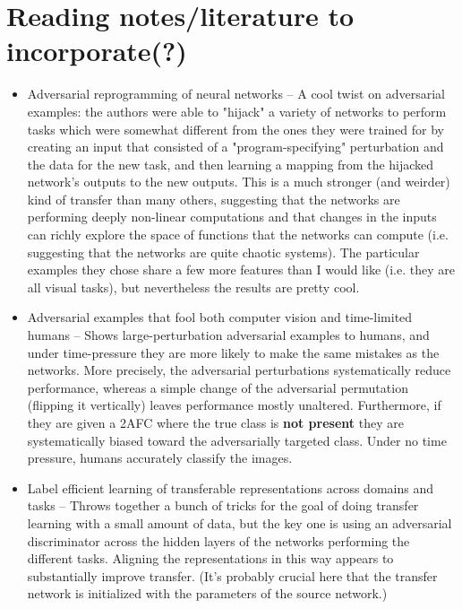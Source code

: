 \documentclass[11pt]{article}
\begin{document}
\section{Reading notes/literature to incorporate(?)}
\begin{itemize}
\item Adversarial reprogramming of neural networks -- A cool twist on adversarial examples: the authors were able to "hijack" a variety of networks to perform tasks which were somewhat different from the ones they were trained for by creating an input that consisted of a "program-specifying" perturbation and the data for the new task, and then learning a mapping from the hijacked network's outputs to the new outputs. This is a much stronger (and weirder) kind of transfer than many others, suggesting that the networks are performing deeply non-linear computations and that changes in the inputs can richly explore the space of functions that the networks can compute (i.e. suggesting that the networks are quite chaotic systems). The particular examples they chose share a few more features than I would like (i.e. they are all visual tasks), but nevertheless the results are pretty cool. \citep{Elsayed2018}
\item Adversarial examples that fool both computer vision and time-limited humans -- Shows large-perturbation adversarial examples to humans, and under time-pressure they are more likely to make the same mistakes as the networks. More precisely, the adversarial perturbations systematically reduce performance, whereas a simple change of the adversarial permutation (flipping it vertically) leaves performance mostly unaltered. Furthermore, if they are given a 2AFC where the true class is \textbf{not present} they are systematically biased toward the adversarially targeted class. Under no time pressure, humans accurately classify the images.
\item Label efficient learning of transferable representations across domains and tasks -- Throws together a bunch of tricks for the goal of doing transfer learning with a small amount of data, but the key one is using an adversarial discriminator across the hidden layers of the networks performing the different tasks. Aligning the representations in this way appears to substantially improve transfer. (It's probably crucial here that the transfer network is initialized with the parameters of the source network.) \citep{Luo2017} 

\end{itemize}
\end{document}
